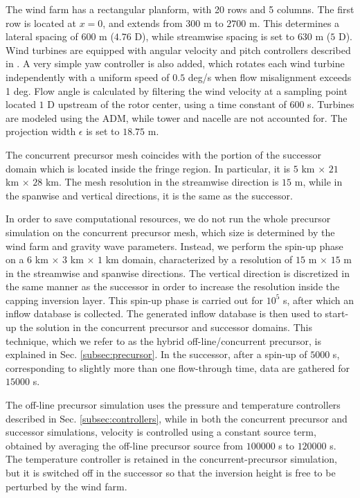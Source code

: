 \documentclass[journal abbreviation, manuscript]{copernicus}
\begin{document}
The wind farm has a rectangular planform, with 20 rows and 5 columns. The first row is located at $x=0$, and extends from $300$ m to $2700$ m. This determines a lateral spacing of $600$ m ($4.76$ D), while streamwise spacing is set to $630$ m ($5$ D). Wind turbines are equipped with angular velocity and pitch controllers described in \cite{2009_JonkmanEtAl}. A very simple yaw controller is also added, which rotates each wind turbine independently with a uniform speed of $0.5$ deg/s when flow misalignment exceeds 1 deg. Flow angle is calculated by filtering the wind velocity at a sampling point located $1$ D upstream of the rotor center, using a time constant of $600$ s. Turbines are modeled using the ADM, while tower and nacelle are not accounted for. The projection width $\epsilon$ is set to $18.75$ m. 

The concurrent precursor mesh coincides with the portion of the successor domain which is located inside the fringe region. In particular, it is $5$ km $\times$ $21$ km $\times$ $28$ km. The mesh resolution in the streamwise direction is $15$ m, while in the spanwise and vertical directions, it is the same as the successor. 

In order to save computational resources, we do not run the whole precursor simulation on the concurrent precursor mesh, which size is determined by the wind farm and gravity wave parameters. Instead, we perform the spin-up phase on a $6$ km $\times$ $3$ km $\times$ $1$ km domain, characterized by a resolution of $15$ m $\times$ $15$ m in the streamwise and spanwise directions. The vertical direction is discretized in the same manner as the successor in order to increase the resolution inside the capping inversion layer. This spin-up phase is carried out for $10^5$ s, after which an inflow database is collected. The generated inflow database is then used to start-up the solution in the concurrent precursor and successor domains. This technique, which we refer to as the hybrid off-line/concurrent precursor, is explained in Sec. \ref{subsec:precursor}. In the successor, after a spin-up of $5000$ s, corresponding to slightly more than one flow-through time, data are gathered for $15000$ s. 

The off-line precursor simulation uses the pressure and temperature controllers described in Sec. \ref{subsec:controllers}, while in both the concurrent precursor and successor simulations, velocity is controlled using a constant source term, obtained by averaging the off-line precursor source from $100000$ s to $120000$ s. The temperature controller is retained in the concurrent-precursor simulation, but it is switched off in the successor so that the inversion height is free to be perturbed by the wind farm. 
\end{document}
